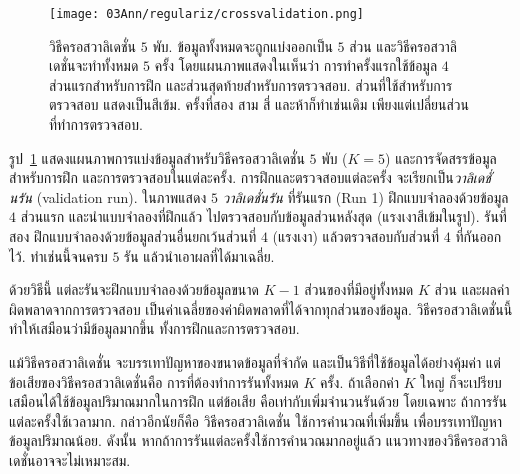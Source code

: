 %
\begin{figure}
	\begin{center}
		\texttt{[image: 03Ann/regulariz/crossvalidation.png]}
	\end{center}
	\caption[วิธีครอสวาลิเดชั่นห้าพับ]{วิธีครอสวาลิเดชั่น $5$ พับ. 
		ข้อมูลทั้งหมดจะถูกแบ่งออกเป็น $5$ ส่วน 
		และวิธีครอสวาลิเดชั่นจะทำทั้งหมด $5$ ครั้ง
		โดยแผนภาพแสดงในเห็นว่า การทำครั้งแรกใช้ข้อมูล $4$ ส่วนแรกสำหรับการฝึก และส่วนสุดท้ายสำหรับการตรวจสอบ.
		ส่วนที่ใช้สำหรับการตรวจสอบ แสดงเป็นสีเข้ม.
		ครั้งที่สอง สาม สี่ และห้าก็ทำเช่นเดิม เพียงแต่เปลี่ยนส่วนที่ทำการตรวจสอบ.
	}
	\label{fig: bg cross validation}
\end{figure}
%

รูป~\ref{fig: bg cross validation} แสดงแผนภาพการแบ่งข้อมูลสำหรับวิธีครอสวาลิเดชั่น $5$ พับ ($K=5$) และการจัดสรรข้อมูลสำหรับการฝึก และการตรวจสอบในแต่ละครั้ง. 
การฝึกและตรวจสอบแต่ละครั้ง
จะเรียกเป็น\textit{วาลิเดชั่นรัน} (validation run).
ในภาพแสดง $5$ \textit{วาลิเดชั่นรัน} 
ที่รันแรก (Run 1) ฝึกแบบจำลองด้วยข้อมูล $4$ ส่วนแรก 
และนำแบบจำลองที่ฝึกแล้ว ไปตรวจสอบกับข้อมูลส่วนหลังสุด (แรงเงาสีเข้มในรูป).
รันที่สอง ฝึกแบบจำลองด้วยข้อมูลส่วนอื่นยกเว้นส่วนที่ $4$ (แรงเงา) 
แล้วตรวจสอบกับส่วนที่ $4$ ที่กันออกไว้.
ทำเช่นนี้จนครบ $5$ รัน แล้วนำเอาผลที่ได้มาเฉลี่ย.

ด้วยวิธีนี้ แต่ละรันจะฝึกแบบจำลองด้วยข้อมูลขนาด $K-1$ ส่วนของที่มีอยู่ทั้งหมด $K$ ส่วน 
และผลค่าผิดพลาดจากการตรวจสอบ เป็นค่าเฉลี่ยของค่าผิดพลาดที่ได้จากทุกส่วนของข้อมูล.
วิธีครอสวาลิเดชั่นนี้ ทำให้เสมือนว่ามีข้อมูลมากขึ้น ทั้งการฝึกและการตรวจสอบ.

แม้วิธีครอสวาลิเดชั่น
จะบรรเทาปัญหาของขนาดข้อมูลที่จำกัด และเป็นวิธีที่ใช้ข้อมูลได้อย่างคุ้มค่า
แต่ข้อเสียของวิธีครอสวาลิเดชั่นคือ การที่ต้องทำการรันทั้งหมด $K$ ครั้ง.
ถ้าเลือกค่า $K$ ใหญ่ ก็จะเปรียบเสมือนได้ใช้ข้อมูลปริมาณมากในการฝึก
แต่ข้อเสีย คือเท่ากับเพิ่มจำนวนรันด้วย
โดยเฉพาะ ถ้าการรันแต่ละครั้งใช้เวลามาก.
กล่าวอีกนัยก็คือ วิธีครอสวาลิเดชั่น
ใช้การคำนวณที่เพิ่มขึ้น เพื่อบรรเทาปัญหาข้อมูลปริมาณน้อย.
ดังนั้น หากถ้าการรันแต่ละครั้งใช้การคำนวณมากอยู่แล้ว แนวทางของวิธีครอสวาลิเดชั่นอาจจะไม่เหมาะสม.



